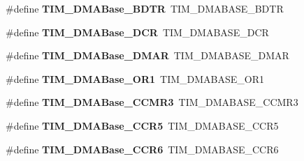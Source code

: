 \begin{DoxyCompactItemize}
\item 
\hypertarget{group___h_a_l___t_i_m___aliased___defines_gaaff22bbf3091c47783c1c68b648c8605}{\#define {\bfseries T\-I\-M\-\_\-\-D\-M\-A\-Base\-\_\-\-B\-D\-T\-R}~T\-I\-M\-\_\-\-D\-M\-A\-B\-A\-S\-E\-\_\-\-B\-D\-T\-R}\label{group___h_a_l___t_i_m___aliased___defines_gaaff22bbf3091c47783c1c68b648c8605}

\item 
\hypertarget{group___h_a_l___t_i_m___aliased___defines_ga59e2206e4e03b9d55c9fb5a24e29b01c}{\#define {\bfseries T\-I\-M\-\_\-\-D\-M\-A\-Base\-\_\-\-D\-C\-R}~T\-I\-M\-\_\-\-D\-M\-A\-B\-A\-S\-E\-\_\-\-D\-C\-R}\label{group___h_a_l___t_i_m___aliased___defines_ga59e2206e4e03b9d55c9fb5a24e29b01c}

\item 
\hypertarget{group___h_a_l___t_i_m___aliased___defines_gaf2b823d37e722f9f856c654fa35eff26}{\#define {\bfseries T\-I\-M\-\_\-\-D\-M\-A\-Base\-\_\-\-D\-M\-A\-R}~T\-I\-M\-\_\-\-D\-M\-A\-B\-A\-S\-E\-\_\-\-D\-M\-A\-R}\label{group___h_a_l___t_i_m___aliased___defines_gaf2b823d37e722f9f856c654fa35eff26}

\item 
\hypertarget{group___h_a_l___t_i_m___aliased___defines_ga6868a38c42996b41d072025ce428c645}{\#define {\bfseries T\-I\-M\-\_\-\-D\-M\-A\-Base\-\_\-\-O\-R1}~T\-I\-M\-\_\-\-D\-M\-A\-B\-A\-S\-E\-\_\-\-O\-R1}\label{group___h_a_l___t_i_m___aliased___defines_ga6868a38c42996b41d072025ce428c645}

\item 
\hypertarget{group___h_a_l___t_i_m___aliased___defines_gaeea36845ff52e436a46a294d0d01a193}{\#define {\bfseries T\-I\-M\-\_\-\-D\-M\-A\-Base\-\_\-\-C\-C\-M\-R3}~T\-I\-M\-\_\-\-D\-M\-A\-B\-A\-S\-E\-\_\-\-C\-C\-M\-R3}\label{group___h_a_l___t_i_m___aliased___defines_gaeea36845ff52e436a46a294d0d01a193}

\item 
\hypertarget{group___h_a_l___t_i_m___aliased___defines_ga8e5e6af97873ab26e62274624f31adae}{\#define {\bfseries T\-I\-M\-\_\-\-D\-M\-A\-Base\-\_\-\-C\-C\-R5}~T\-I\-M\-\_\-\-D\-M\-A\-B\-A\-S\-E\-\_\-\-C\-C\-R5}\label{group___h_a_l___t_i_m___aliased___defines_ga8e5e6af97873ab26e62274624f31adae}

\item 
\hypertarget{group___h_a_l___t_i_m___aliased___defines_ga9ab65ba1f7609de8bd7bf20319e60232}{\#define {\bfseries T\-I\-M\-\_\-\-D\-M\-A\-Base\-\_\-\-C\-C\-R6}~T\-I\-M\-\_\-\-D\-M\-A\-B\-A\-S\-E\-\_\-\-C\-C\-R6}\label{group___h_a_l___t_i_m___aliased___defines_ga9ab65ba1f7609de8bd7bf20319e60232}


\end{DoxyCompactItemize}
